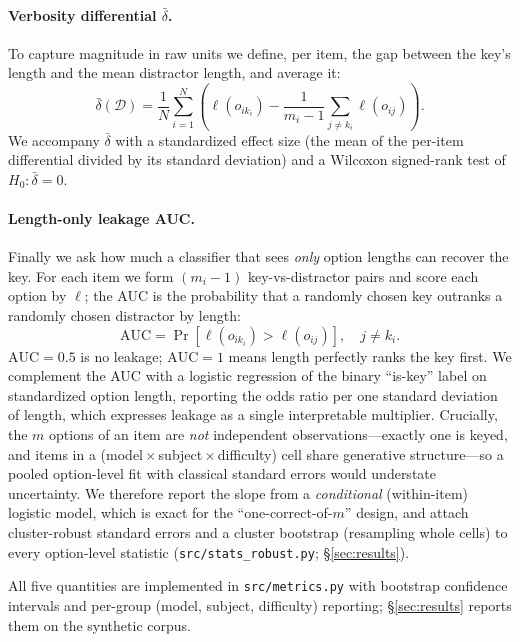 \documentclass[10pt,twocolumn]{article}
\begin{document}
\paragraph{Verbosity differential $\bar\delta$.} To capture magnitude in raw
units we define, per item, the gap between the key's length and the mean
distractor length, and average it:
\begin{equation}
\bar\delta(\mathcal{D})=\frac{1}{N}\sum_{i=1}^{N}\!\left(
\ell(o_{ik_i})-\frac{1}{m_i-1}\sum_{j\neq k_i}\ell(o_{ij})\right).
\label{eq:delta}
\end{equation}
We accompany $\bar\delta$ with a standardized effect size (the mean of the
per-item differential divided by its standard deviation) and a Wilcoxon
signed-rank test of $H_0:\bar\delta=0$.

\paragraph{Length-only leakage AUC.} Finally we ask how much a classifier that
sees \emph{only} option lengths can recover the key. For each item we form
$(m_i-1)$ key-vs-distractor pairs and score each option by $\ell$; the AUC is
the probability that a randomly chosen key outranks a randomly chosen
distractor by length:
\begin{equation}
\mathrm{AUC}=\Pr\!\left[\ell(o_{ik_i})>\ell(o_{ij})\right],\quad j\neq k_i.
\label{eq:auc}
\end{equation}
$\mathrm{AUC}=0.5$ is no leakage; $\mathrm{AUC}=1$ means length perfectly
ranks the key first. We complement the AUC with a logistic regression of the
binary ``is-key'' label on standardized option length, reporting the odds
ratio per one standard deviation of length, which expresses leakage as a
single interpretable multiplier. Crucially, the $m$ options of an item are
\emph{not} independent observations---exactly one is keyed, and items in a
(model\,$\times$\,subject\,$\times$\,difficulty) cell share generative
structure---so a pooled option-level fit with classical standard errors would
understate uncertainty. We therefore report the slope from a \emph{conditional}
(within-item) logistic model, which is exact for the ``one-correct-of-$m$''
design, and attach cluster-robust standard errors and a cluster bootstrap
(resampling whole cells) to every option-level statistic
(\texttt{src/stats\_robust.py}; \S\ref{sec:results}).

All five quantities are implemented in \texttt{src/metrics.py} with
bootstrap confidence intervals and per-group (model, subject, difficulty)
reporting; \S\ref{sec:results} reports them on the synthetic corpus.
\end{document}
